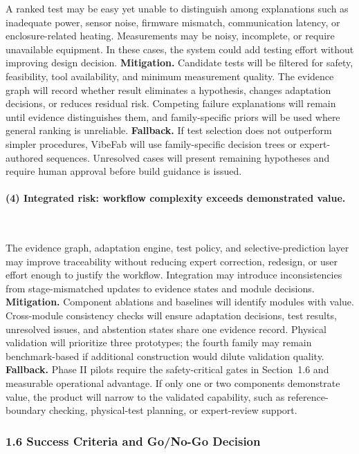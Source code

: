 \documentclass[11pt,letterpaper]{article}
\begin{document}
A ranked test may be easy yet unable to distinguish among explanations such as inadequate power, sensor noise, firmware mismatch, communication latency, or enclosure-related heating. Measurements may be noisy, incomplete, or require unavailable equipment. In these cases, the system could add testing effort without improving design decision.
\textbf{Mitigation.} Candidate tests will be filtered for safety, feasibility, tool availability, and minimum measurement quality. The evidence graph will record whether result eliminates a hypothesis, changes adaptation decisions, or reduces residual risk. Competing failure explanations will remain until evidence distinguishes them, and family-specific priors will be used where general ranking is unreliable.
\textbf{Fallback.} If test selection does not outperform simpler procedures, VibeFab will use family-specific decision trees or expert-authored sequences. Unresolved cases will present remaining hypotheses and require human approval before build guidance is issued.

\paragraph{(4) Integrated risk: workflow complexity exceeds demonstrated value.}~{}

The evidence graph, adaptation engine, test policy, and selective-prediction layer may improve traceability without reducing expert correction, redesign, or user effort enough to justify the workflow. Integration may introduce inconsistencies from stage-mismatched updates to evidence states and module decisions.
\textbf{Mitigation.} Component ablations and baselines will identify modules with value. Cross-module consistency checks will ensure adaptation decisions, test results, unresolved issues, and abstention states share one evidence record. Physical validation will prioritize three prototypes; the fourth family may remain benchmark-based if additional construction would dilute validation quality.
\textbf{Fallback.} Phase II pilots require the safety-critical gates in Section~1.6 and measurable operational advantage. If only one or two components demonstrate value, the product will narrow to the validated capability, such as reference-boundary checking, physical-test planning, or expert-review support.


\subsubsection*{1.6 Success Criteria and Go/No-Go Decision}
\end{document}
